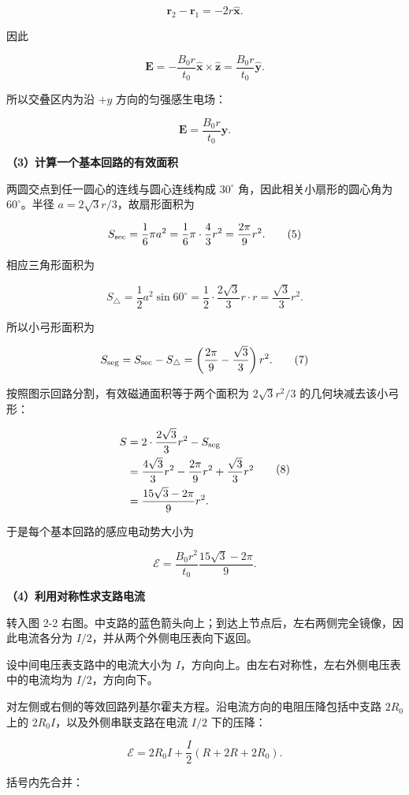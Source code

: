 \documentclass[12pt,a4paper,UTF8]{ctexart}
\begin{document}
\[
\bm r_2-\bm r_1=-2r\hat{\bm x}.
\]

因此

\[
\bm E
=-\frac{B_0r}{t_0}\hat{\bm x}\times\hat{\bm z}
=\frac{B_0r}{t_0}\hat{\bm y}.
\]

所以交叠区内为沿 \(+y\) 方向的匀强感生电场：

\[
\boxed{\bm E=\frac{B_0r}{t_0}\hat{\bm y}}.
\tag{4}
\]

\textbf{（3）计算一个基本回路的有效面积}

两圆交点到任一圆心的连线与圆心连线构成 \(30^\circ\)
角，因此相关小扇形的圆心角为 \(60^\circ\)。半径
\(a=2\sqrt3r/3\)，故扇形面积为

\[
S_{\rm sec}=\frac16\pi a^2
=\frac16\pi\cdot\frac43r^2
=\frac{2\pi}{9}r^2.
\tag{5}
\]

相应三角形面积为

\[
S_{\triangle}=\frac12a^2\sin60^\circ
=\frac12\cdot\frac{2\sqrt3}{3}r\cdot r
=\frac{\sqrt3}{3}r^2.
\tag{6}
\]

所以小弓形面积为

\[
S_{\rm seg}=S_{\rm sec}-S_{\triangle}
=\left(\frac{2\pi}{9}-\frac{\sqrt3}{3}\right)r^2.
\tag{7}
\]

按照图示回路分割，有效磁通面积等于两个面积为 \(2\sqrt3r^2/3\)
的几何块减去该小弓形：

\[
\begin{aligned}
S
&=2\cdot\frac{2\sqrt3}{3}r^2-S_{\rm seg}\\
&=\frac{4\sqrt3}{3}r^2-\frac{2\pi}{9}r^2+\frac{\sqrt3}{3}r^2\\
&=\frac{15\sqrt3-2\pi}{9}r^2.
\end{aligned}
\tag{8}
\]

于是每个基本回路的感应电动势大小为

\[
\boxed{\mathcal E=\frac{B_0r^2}{t_0}\frac{15\sqrt3-2\pi}{9}}.
\tag{9}
\]

\textbf{（4）利用对称性求支路电流}

转入图 2-2
右图。中支路的蓝色箭头向上；到达上节点后，左右两侧完全镜像，因此电流各分为
\(I/2\)，并从两个外侧电压表向下返回。

设中间电压表支路中的电流大小为
\(I\)，方向向上。由左右对称性，左右外侧电压表中的电流均为
\(I/2\)，方向向下。

对左侧或右侧的等效回路列基尔霍夫方程。沿电流方向的电阻压降包括中支路
\(2R_0\) 上的 \(2R_0I\)，以及外侧串联支路在电流 \(I/2\) 下的压降：

\[
\mathcal E
=2R_0I+\frac I2(R+2R+2R_0).
\tag{10}
\]

括号内先合并：
\end{document}

